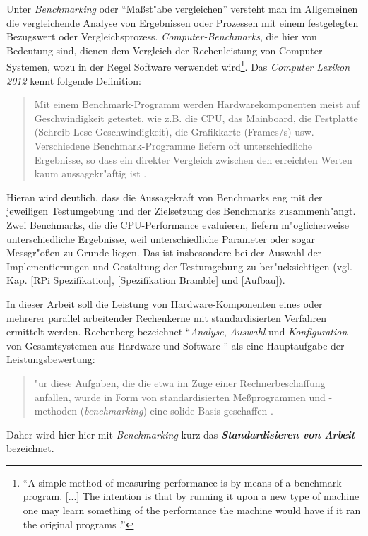 Unter \textit{Benchmarking} oder "`Ma\ss st"abe vergleichen"' versteht man im Allgemeinen die vergleichende Analyse von Ergebnissen oder Prozessen mit einem festgelegten Bezugswert oder Vergleichsprozess. \textit{Computer-Benchmarks}, die hier von Bedeutung sind, dienen dem Vergleich der Rechenleistung von Computer-Systemen, wozu in der Regel Software verwendet wird\footnote{"`A simple method of measuring performance is by means of a benchmark program. [...] The intention is that by running it upon a new type of machine one may learn something of the performance the machine would have if it ran the original programs \cite{cur76}."'}. Das \textit{Computer Lexikon 2012} kennt folgende Definition: 
\begin{quote}
\onehalfspacing
Mit einem Benchmark-Programm werden Hardwarekomponenten meist auf Geschwindigkeit getestet, wie z.B. die CPU, das Mainboard, die Festplatte (Schreib-Lese-Geschwindigkeit), die Grafikkarte (Frames/s) usw. Verschiedene Benchmark-Programme liefern oft unterschiedliche Ergebnisse, so dass ein direkter Vergleich zwischen den erreichten Werten kaum aussagekr"aftig ist \cite{pre11}. 
\end{quote}
Hieran wird deutlich, dass die Aussagekraft von Benchmarks eng mit der jeweiligen Testumgebung und der Zielsetzung des Benchmarks zusammenh"angt. Zwei Benchmarks, die die CPU-Performance evaluieren, liefern m"oglicherweise unterschiedliche Ergebnisse, weil unterschiedliche Parameter oder sogar Messgr"o\ss en zu Grunde liegen. Das ist insbesondere bei der Auswahl der Implementierungen und Gestaltung der Testumgebung zu ber"ucksichtigen (vgl. Kap. \ref{RPi Spezifikation}, \ref{Spezifikation Bramble} und \ref{Aufbau}). 

In dieser Arbeit soll die Leistung von Hardware-Komponenten eines oder mehrerer parallel arbeitender Rechenkerne mit standardisierten Verfahren ermittelt werden. Rechenberg bezeichnet "`\textit{Analyse}, \textit{Auswahl} und \textit{Konfiguration} von Gesamtsystemen aus Hardware und Software \cite{rec06}"' als eine Hauptaufgabe der Leistungsbewertung: 
\begin{quote}
\onehalfspacing
[F]"ur diese Aufgaben, die die etwa im Zuge einer Rechnerbeschaffung anfallen, wurde in Form von standardisierten Me\ss programmen und -methoden (\textit{benchmarking}) eine solide Basis geschaffen \cite{rec06}. 
\end{quote} 
Daher wird hier hier mit \textit{Benchmarking} kurz das \textbf{\textit{Standardisieren von Arbeit}} bezeichnet.

